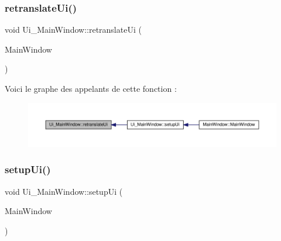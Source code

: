 \subsubsection{\texorpdfstring{retranslate\+Ui()}{retranslateUi()}}
{\footnotesize\ttfamily void Ui\+\_\+\+Main\+Window\+::retranslate\+Ui (\begin{DoxyParamCaption}\item[{Q\+Main\+Window $\ast$}]{Main\+Window }\end{DoxyParamCaption})\hspace{0.3cm}{\ttfamily [inline]}}

Voici le graphe des appelants de cette fonction \+:
\nopagebreak
\begin{figure}[H]
\begin{center}
\leavevmode
\includegraphics[width=350pt]{class_ui___main_window_a097dd160c3534a204904cb374412c618_icgraph}
\end{center}
\end{figure}
\mbox{\label{class_ui___main_window_acf4a0872c4c77d8f43a2ec66ed849b58}} 
\subsubsection{\texorpdfstring{setup\+Ui()}{setupUi()}}
{\footnotesize\ttfamily void Ui\+\_\+\+Main\+Window\+::setup\+Ui (\begin{DoxyParamCaption}\item[{Q\+Main\+Window $\ast$}]{Main\+Window }\end{DoxyParamCaption})\hspace{0.3cm}{\ttfamily [inline]}}

